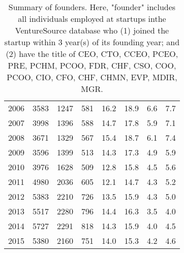 \begin{table}[!htb]
\begin{tabular}{p{1.75cm}p{1.75cm}p{1.75cm}p{1.75cm}p{1.75cm}p{1.75cm}p{1.75cm}p{1.75cm}}
  2006 & 3583 & 1247 & 581 & 16.2 & 18.9 & 6.6 & 7.7 \\ 
  2007 & 3998 & 1396 & 588 & 14.7 & 17.8 & 5.9 & 7.1 \\ 
  2008 & 3671 & 1329 & 567 & 15.4 & 18.7 & 6.1 & 7.4 \\ 
  2009 & 3596 & 1399 & 513 & 14.3 & 17.3 & 4.9 & 5.9 \\ 
  2010 & 3976 & 1628 & 509 & 12.8 & 15.8 & 4.5 & 5.6 \\ 
  2011 & 4980 & 2036 & 605 & 12.1 & 14.7 & 4.3 & 5.2 \\ 
  2012 & 5383 & 2210 & 726 & 13.5 & 15.9 & 4.3 & 5.0 \\ 
  2013 & 5517 & 2280 & 796 & 14.4 & 16.3 & 3.5 & 4.0 \\ 
  2014 & 5727 & 2291 & 818 & 14.3 & 15.9 & 4.0 & 4.5 \\ 
  2015 & 5380 & 2160 & 751 & 14.0 & 15.3 & 4.2 & 4.6 \\ 
   \bottomrule
\end{tabular}
\endgroup
\caption{Summary of founders. Here, "founder" includes all individuals employed at startups inthe VentureSource database who (1) joined the startup within 3 year(s) of its founding year; and (2) have the title of CEO, CTO, CCEO, PCEO, PRE, PCHM, PCOO, FDR, CHF, CSO, COO, PCOO, CIO, CFO, CHF, CHMN, EVP, MDIR, MGR.} 
\label{table:GStable_executive}
\end{table}

